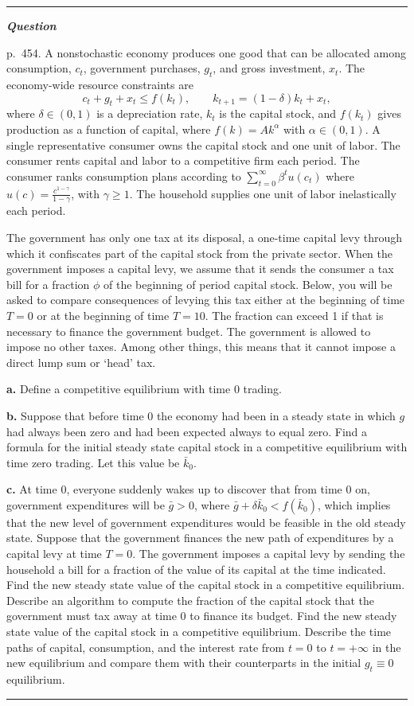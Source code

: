 \documentclass[12pt, letterpaper]{article}
\newenvironment{longquestion}{\par\small\noindent\textcolor{gray!60}{\rule{\linewidth}{0.4pt}}\par\nobreak
  \noindent\textcolor{gray!60!black}{\bfseries\textit{Question}}\par\nobreak}{\par\noindent
  \textcolor{gray!60}{\rule{\linewidth}{0.4pt}}\par}
\begin{document}
\begin{tcolorbox}[evenbox,title={Exercise 11.4 \quad A capital levy}]
\begin{longquestion}
p.~454. A nonstochastic economy produces one good that can be allocated among consumption, $c_t$, government purchases,
$g_t$, and gross investment, $x_t$. The economy-wide resource constraints are
\[
c_t+g_t+x_t\le f(k_t),\qquad k_{t+1}=(1-\delta)k_t+x_t,
\]
where $\delta\in(0,1)$ is a depreciation rate, $k_t$ is the capital stock, and $f(k_t)$ gives production as a function of
capital, where $f(k)=Ak^\alpha$ with $\alpha\in(0,1)$. A single representative consumer owns the capital stock and one
unit of labor. The consumer rents capital and labor to a competitive firm each period. The consumer ranks consumption
plans according to $\sum_{t=0}^\infty\beta^tu(c_t)$ where $u(c)=\frac{c^{1-\gamma}}{1-\gamma}$, with $\gamma\ge1$. The
household supplies one unit of labor inelastically each period.

The government has only one tax at its disposal, a one-time capital levy through which it confiscates part of the capital
stock from the private sector. When the government imposes a capital levy, we assume that it sends the consumer a tax bill
for a fraction $\phi$ of the beginning of period capital stock. Below, you will be asked to compare consequences of
levying this tax either at the beginning of time $T=0$ or at the beginning of time $T=10$. The fraction can exceed 1 if
that is necessary to finance the government budget. The government is allowed to impose no other taxes. Among other
things, this means that it cannot impose a direct lump sum or `head' tax.

\textbf{a.} Define a competitive equilibrium with time 0 trading.

\textbf{b.} Suppose that before time 0 the economy had been in a steady state in which $g$ had always been zero and had
been expected always to equal zero. Find a formula for the initial steady state capital stock in a competitive
equilibrium with time zero trading. Let this value be $\bar k_0$.

\textbf{c.} At time 0, everyone suddenly wakes up to discover that from time 0 on, government expenditures will be
$\bar g>0$, where $\bar g+\delta\bar k_0<f(\bar k_0)$, which implies that the new level of government expenditures would
be feasible in the old steady state. Suppose that the government finances the new path of expenditures by a capital levy
at time $T=0$. The government imposes a capital levy by sending the household a bill for a fraction of the value of its
capital at the time indicated. Find the new steady state value of the capital stock in a competitive equilibrium.
Describe an algorithm to compute the fraction of the capital stock that the government must tax away at time 0 to
finance its budget. Find the new steady state value of the capital stock in a competitive equilibrium. Describe the time
paths of capital, consumption, and the interest rate from $t=0$ to $t=+\infty$ in the new equilibrium and compare them
with their counterparts in the initial $g_t\equiv0$ equilibrium.


\end{longquestion}
\end{tcolorbox}
\end{document}
